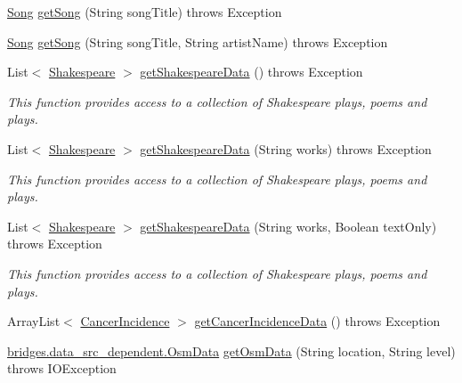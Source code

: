 \begin{DoxyCompactItemize}
\item 
\mbox{\hyperlink{classbridges_1_1data__src__dependent_1_1_song}{Song}} \mbox{\hyperlink{classbridges_1_1connect_1_1_data_source_a4f49b088703c74d68bd854d40edc5ad4}{get\+Song}} (String song\+Title)  throws Exception 
\item 
\mbox{\hyperlink{classbridges_1_1data__src__dependent_1_1_song}{Song}} \mbox{\hyperlink{classbridges_1_1connect_1_1_data_source_a935ea2005b7de3cb22c1e55027b81460}{get\+Song}} (String song\+Title, String artist\+Name)  throws Exception 
\item 
List$<$ \mbox{\hyperlink{classbridges_1_1data__src__dependent_1_1_shakespeare}{Shakespeare}} $>$ \mbox{\hyperlink{classbridges_1_1connect_1_1_data_source_af2b6e5df074d0a689e8a992b1bea6f3e}{get\+Shakespeare\+Data}} ()  throws Exception 
\begin{DoxyCompactList}\small\item\em This function provides access to a collection of Shakespeare plays, poems and plays. \end{DoxyCompactList}\item 
List$<$ \mbox{\hyperlink{classbridges_1_1data__src__dependent_1_1_shakespeare}{Shakespeare}} $>$ \mbox{\hyperlink{classbridges_1_1connect_1_1_data_source_a04aa757c45139e52525d4b09156abfe1}{get\+Shakespeare\+Data}} (String works)  throws Exception 
\begin{DoxyCompactList}\small\item\em This function provides access to a collection of Shakespeare plays, poems and plays. \end{DoxyCompactList}\item 
List$<$ \mbox{\hyperlink{classbridges_1_1data__src__dependent_1_1_shakespeare}{Shakespeare}} $>$ \mbox{\hyperlink{classbridges_1_1connect_1_1_data_source_abf8e8f8ff3eb14fa6c6b5ce6b48dbadb}{get\+Shakespeare\+Data}} (String works, Boolean text\+Only)  throws Exception 
\begin{DoxyCompactList}\small\item\em This function provides access to a collection of Shakespeare plays, poems and plays. \end{DoxyCompactList}\item 
Array\+List$<$ \mbox{\hyperlink{classbridges_1_1data__src__dependent_1_1_cancer_incidence}{Cancer\+Incidence}} $>$ \mbox{\hyperlink{classbridges_1_1connect_1_1_data_source_a320ce56eeb655c54c0fbed455e0d9f5e}{get\+Cancer\+Incidence\+Data}} ()  throws Exception 
\item 
\mbox{\hyperlink{classbridges_1_1data__src__dependent_1_1_osm_data}{bridges.\+data\+\_\+src\+\_\+dependent.\+Osm\+Data}} \mbox{\hyperlink{classbridges_1_1connect_1_1_data_source_ae82f6a4feff0af28f4aae55986e1560c}{get\+Osm\+Data}} (String location, String level)  throws I\+O\+Exception 

\end{DoxyCompactItemize}
